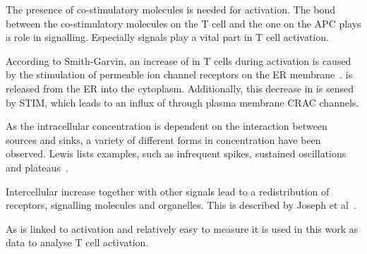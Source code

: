 The presence of co-stimulatory molecules is needed for activation. The bond between the co-stimulatory molecules on the T cell and the one on the APC plays a role in signalling. Especially \Calcium signals play a vital part in T cell activation.

According to Smith-Garvin, an increase of \Calcium in T cells during activation is caused by the stimulation of \Calcium permeable ion channel receptors on the ER membrane~\cite{smith2009}. \Calcium is released from the ER into the cytoplasm. Additionally, this decrease in \Calcium is sensed by STIM, which leads to an influx of \Calcium through plasma membrane CRAC channels.
\newpage

As the intracellular \Calcium concentration is dependent on the interaction between \Calcium sources and sinks, a variety of different forms in \Calcium concentration have been observed. Lewis lists examples, such as infrequent spikes, sustained oscillations and plateaus~\cite{Lewis2001}.

Intercellular \Calcium increase together with other signals lead to a redistribution of receptors, signalling molecules and organelles. This is described by Joseph et al~\cite{joseph2014}.

As \Calcium is linked to activation and relatively easy to measure it is used in this work as data to analyse T cell activation.
